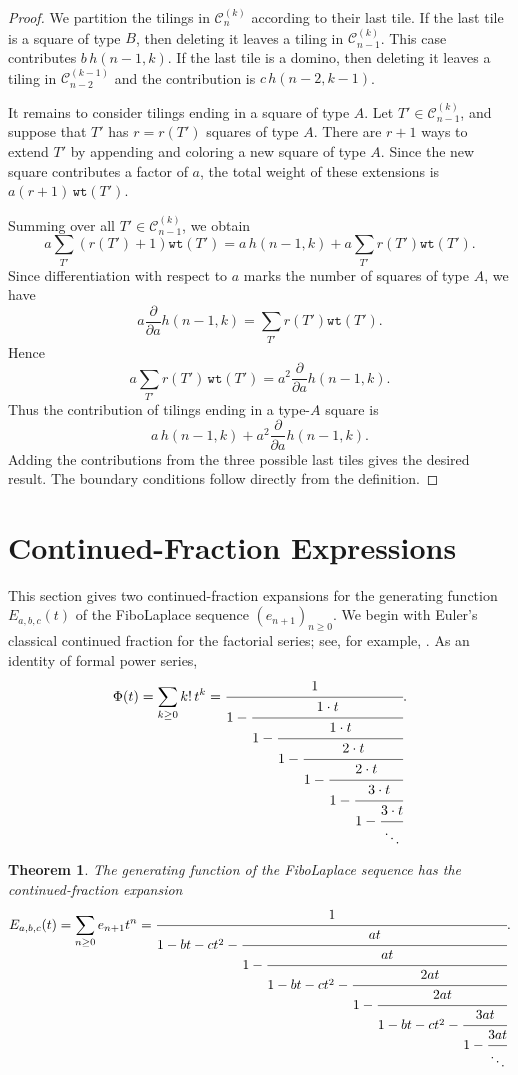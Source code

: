 \documentclass[11pt]{amsart}
\newcommand{\wt}{{\texttt{wt}}}
\theoremstyle{plain}
\numberwithin{equation}{section}
\newtheorem{theorem}[thm]{Theorem}
\begin{document}
\begin{proof}
We partition the tilings in $\mathcal C_n^{(k)}$ according to their
last tile. If the last tile is a square of type $B$, then deleting it leaves a tiling in $\mathcal C_{n-1}^{(k)}$. This case contributes $b\,h(n-1,k)$. If the last tile is a domino, then deleting it leaves a tiling in $\mathcal C_{n-2}^{(k-1)}$ and the contribution is
$c\,h(n-2,k-1)$.

It remains to consider tilings ending in a square of type $A$.  Let $T'\in \mathcal C_{n-1}^{(k)}$, and suppose that $T'$ has $r=r(T')$ squares of type $A$. There are $r+1$ ways to extend $T'$ by appending
and coloring a new square of type $A$.  Since the new square contributes a
factor of $a$, the total weight of these extensions is  $a(r+1)\,\wt(T')$.


Summing over all $T'\in \mathcal C_{n-1}^{(k)}$, we obtain
\[
a\sum_{T'}(r(T')+1)\wt(T')
=
a\,h(n-1,k)
+a\sum_{T'}r(T')\wt(T').
\]
Since differentiation with respect to $a$ marks the number of squares
of type $A$, we have
\[
a\frac{\partial}{\partial a}h(n-1,k)
=
\sum_{T'}r(T')\wt(T').
\]
Hence
\[
a\sum_{T'} r(T')\,\wt(T')
=
a^2\frac{\partial}{\partial a}h(n-1,k).
\]
Thus the contribution of tilings ending in a type-$A$ square is
\[
a\,h(n-1,k)+a^2\frac{\partial}{\partial a}h(n-1,k).
\]
Adding the contributions from the three possible last tiles gives the desired result. The boundary conditions follow directly from the definition.
\end{proof}

\section{Continued-Fraction Expressions} This section gives two continued-fraction expansions for the generating function $E_{a,b,c}(t)$ of the FiboLaplace sequence $(e_{n+1})_{n\geq 0}$. We begin with Euler's classical continued fraction for the factorial series; see, for example, \cite{Sokal}. As an identity of formal power series,
\begin{equation}\label{fcEuler}
\Phi(t)=\sum_{k\geq 0}k!\,t^k=\cfrac{1}{1-\cfrac{1\cdot t}{1-\cfrac{1\cdot t}{1-\cfrac{2\cdot t}{1-\cfrac{2\cdot t}{1-\cfrac{3\cdot t}{1-\cfrac{3\cdot t}{\ddots}}}}}}}.
\end{equation}

\begin{theorem}\label{thm:continued-fraction}
The generating function of the FiboLaplace sequence has the
continued-fraction expansion
\begin{equation*}
E_{a,b,c}(t)
=
\sum_{n\geq 0}e_{n+1}t^n
=
\cfrac{1}{
1-bt-ct^2-
\cfrac{at}{
1-\cfrac{at}{
1-bt-ct^2-
\cfrac{2at}{
1-\cfrac{2at}{
1-bt-ct^2-
\cfrac{3at}{
1-\cfrac{3at}{\ddots}}}}}}}.
\end{equation*}
\end{theorem}
\end{document}
